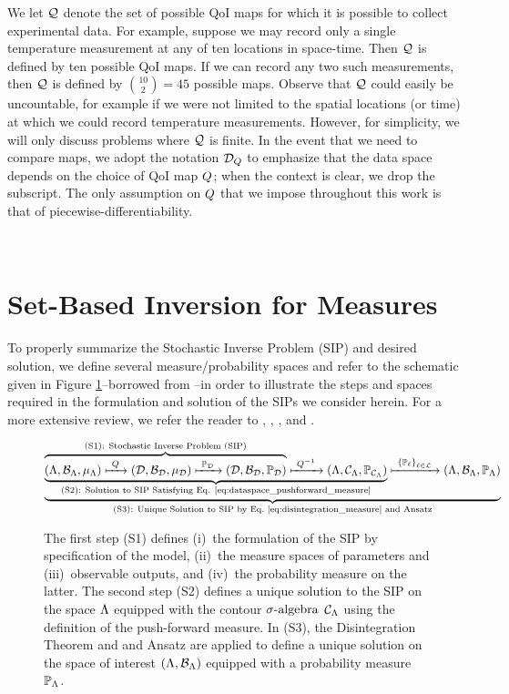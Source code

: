 We let $\mathcal{Q}$ denote the set of possible QoI maps for which it is possible to collect experimental data.
For example, suppose we may record only a single temperature measurement at any of ten locations in space-time.
Then $\mathcal{Q}$ is defined by ten possible QoI maps. 
If we can record any two such measurements, then $\mathcal{Q}$ is defined by $\binom{10}{2} = 45$ possible maps.
Observe that $\mathcal{Q}$ could easily be uncountable, for example if we were not limited to the spatial locations (or time) at which we could record temperature measurements.
However, for simplicity, we will only discuss problems where $\mathcal{Q}$ is finite.
In the event that we need to compare maps, we adopt the notation $\mathcal{D}_{Q}$ to emphasize that the data space depends on the choice of QoI map $Q$; when the context is clear, we drop the subscript.
The only assumption on $Q$ that we impose throughout this work is that of piecewise-differentiability.




\
\section{Set-Based Inversion for Measures}\label{sec:ch02-set}

To properly summarize the Stochastic Inverse Problem (SIP) and desired solution, we define several measure/probability spaces and refer to the schematic given in Figure \ref{fig:scheme}\---borrowed from \cite{BM17}\---in order to illustrate the steps and spaces required in the formulation and solution of the SIPs we consider herein.
For a more extensive review, we refer the reader to \cite{BBE11}, \cite{BES12}, \cite{BET+14}, and \cite{BM17}. 

\begin{figure}[!h]
\begin{equation}
\underbrace{
\underbrace{
\overbrace{ 
 ({\Lambda}, \mathcal{B}_{{\Lambda}}, \mu_{{\Lambda}}) \xmapsto{\  Q \ } (\mathcal{D}, \mathcal{B}_{\mathcal{D}}, \mu_{\mathcal{D}})
  \xmapsto{\ \operatorname*{\mathbb{P}_{\mathcal{D}}}\ } (\mathcal{D}, \mathcal{B}_{\mathcal{D}}, \operatorname*{\mathbb{P}_{\mathcal{D}}})
 }^{
 \text{(S1): Stochastic Inverse Problem (SIP)}
 }
 \xmapsto{\ Q^{-1} \ } ({\Lambda}, \mathcal{C}_{{\Lambda}}, \operatorname*{\mathbb{P}_{\mathcal{C}_{{\Lambda}}}})
 }_{
 \text{(S2): Solution to SIP Satisfying Eq. \eqref{eq:dataspace_pushforward_measure}}} 
 \xmapsto{\ \left\{\mathbb{P}_\ell\right\}_{\ell\in\mathcal{L}} \ } ({\Lambda}, \mathcal{B}_{{\Lambda}}, \operatorname*{\mathbb{P}_{{\Lambda}}})
 }
 _{
 \text{(S3): Unique Solution to SIP by Eq.~\eqref{eq:disintegration_measure} and Ansatz}
 }
\end{equation}
\caption{The first step (S1) defines (i)~the formulation of the SIP by specification of the model, (ii)~the measure spaces of parameters and (iii)~observable outputs, and (iv)~the probability measure on the latter. The second step (S2) defines a unique solution to the SIP on the space ${\Lambda}$ equipped with the contour $\sigma\text{-algebra}$ $\mathcal{C}_{{\Lambda}}$ using the definition of the push-forward measure. In (S3), the Disintegration Theorem and and Ansatz are applied to define a unique solution on the space of interest $({\Lambda}, \mathcal{B}_{{\Lambda}})$ equipped with a probability measure $\operatorname*{\mathbb{P}_{{\Lambda}}}$.}
\label{fig:scheme}
\end{figure}


